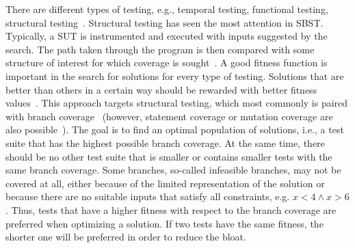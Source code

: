 \documentclass{article}
\begin{document}
There are different types of testing, e.g., temporal testing, functional testing, structural testing~\cite{McMinn2011}. Structural testing has seen the most attention in \ac{SBST}. Typically, a \ac{SUT} is instrumented and executed with inputs suggested by the search. The path taken through the program is then compared with some structure of interest for which coverage is sought~\cite{McMinn2011}. A good fitness function is important in the search for solutions for every type of testing. Solutions that are better than others in a certain way should be rewarded with better fitness values~\cite{McMinn_2004}. This approach targets structural testing, which most commonly is paired with branch coverage~\cite{McMinn2011} (however, statement coverage or mutation coverage are also possible~\cite{Korel1990}). The goal is to find an optimal population of solutions, i.e., a test suite that has the highest possible branch coverage. At the same time, there should be no other test suite that is smaller or contains smaller tests with the same branch coverage. Some branches, so-called infeasible branches, may not be covered at all, either because of the limited representation of the solution or because there are no suitable inputs that satisfy all constraints, e.g. $x < 4 \wedge x > 6$. Thus, tests that have a higher fitness with respect to the branch coverage are preferred when optimizing a solution. If two tests have the same fitness, the shorter one will be preferred in order to reduce the bloat. 

\end{document}
